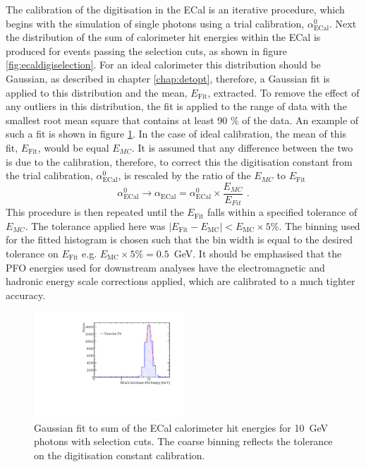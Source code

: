 The calibration of the digitisation in the ECal is an iterative procedure, which begins with the simulation of single photons using a trial calibration, $\alpha^{0}_{\text{ECal}}$.  Next the distribution of the sum of calorimeter hit energies within the ECal is produced for events passing the selection cuts, as shown in figure \ref{fig:ecaldigiselection}.  For an ideal calorimeter this distribution should be Gaussian, as described in chapter \ref{chap:detopt}, therefore, a Gaussian fit is applied to this distribution and the mean, $E_{\text{Fit}}$, extracted.  To remove the effect of any outliers in this distribution, the fit is applied to the range of data with the smallest root mean square that contains at least 90 \% of the data.  An example of such a fit is shown in figure \ref{fig:ecaldigifit}.  In the case of ideal calibration, the mean of this fit, $E_{\text{Fit}}$, would be equal $E_{MC}$.  It is assumed that any difference between the two is due to the calibration, therefore, to correct this the digitisation constant from the trial calibration, $\alpha^{0}_{\text{ECal}}$, is rescaled by the ratio of the $E_{MC}$ to $E_{\text{Fit}}$
%
\begin{equation}
\alpha^{0}_{\text{ECal}} \rightarrow \alpha_{\text{ECal}} = \alpha^{0}_{\text{ECal}} \times \frac{E_{MC}}{E_{Fit}}\text{ .}
\end{equation}
%
This procedure is then repeated until the $E_{\text{Fit}}$ falls within a specified tolerance of $E_{MC}$.  The tolerance applied here was $|E_{\text{Fit}} - E_{\text{MC}}| < E_{\text{MC}} \times 5 \%$.  The binning used for the fitted histogram is chosen such that the bin width is equal to the desired tolerance on $E_{\text{Fit}}$ e.g. $E_{\text{MC}} \times 5 \% = 0.5$~GeV.  It should be emphasised that the PFO energies used for downstream analyses have the electromagnetic and hadronic energy scale corrections applied, which are calibrated to a much tighter accuracy.

\begin{figure}[h!]
\includegraphics[width=0.5\textwidth]{Calibration/Plots/Calibration/Digitsation/ECal/DigitisationECalFit.pdf}
\caption[Gaussian fit to sum of the ECal calorimeter hit energies for 10~GeV photons with selection cuts.  The coarse binning reflects the tolerance on the digitisation constant calibration.]{Gaussian fit to sum of the ECal calorimeter hit energies for 10~GeV photons with selection cuts.  The coarse binning reflects the tolerance on the digitisation constant calibration.}
\label{fig:ecaldigifit}
\end{figure}

